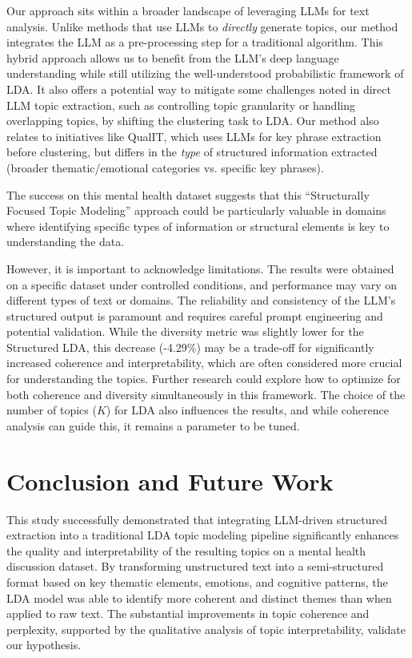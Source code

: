\documentclass{article}
\begin{document}
Our approach sits within a broader landscape of leveraging LLMs for text analysis. Unlike methods that use LLMs to \emph{directly} generate topics, our method integrates the LLM as a pre-processing step for a traditional algorithm. This hybrid approach allows us to benefit from the LLM's deep language understanding while still utilizing the well-understood probabilistic framework of LDA. It also offers a potential way to mitigate some challenges noted in direct LLM topic extraction, such as controlling topic granularity or handling overlapping topics, by shifting the clustering task to LDA. Our method also relates to initiatives like QualIT, which uses LLMs for key phrase extraction before clustering, but differs in the \emph{type} of structured information extracted (broader thematic/emotional categories vs. specific key phrases).

The success on this mental health dataset suggests that this ``Structurally Focused Topic Modeling'' approach could be particularly valuable in domains where identifying specific types of information or structural elements is key to understanding the data.

However, it is important to acknowledge limitations. The results were obtained on a specific dataset under controlled conditions, and performance may vary on different types of text or domains. The reliability and consistency of the LLM's structured output is paramount and requires careful prompt engineering and potential validation. While the diversity metric was slightly lower for the Structured LDA, this decrease (-4.29\%) may be a trade-off for significantly increased coherence and interpretability, which are often considered more crucial for understanding the topics. Further research could explore how to optimize for both coherence and diversity simultaneously in this framework. The choice of the number of topics ($K$) for LDA also influences the results, and while coherence analysis can guide this, it remains a parameter to be tuned.

\section{Conclusion and Future Work}
This study successfully demonstrated that integrating LLM-driven structured extraction into a traditional LDA topic modeling pipeline significantly enhances the quality and interpretability of the resulting topics on a mental health discussion dataset. By transforming unstructured text into a semi-structured format based on key thematic elements, emotions, and cognitive patterns, the LDA model was able to identify more coherent and distinct themes than when applied to raw text. The substantial improvements in topic coherence and perplexity, supported by the qualitative analysis of topic interpretability, validate our hypothesis.
\end{document}
